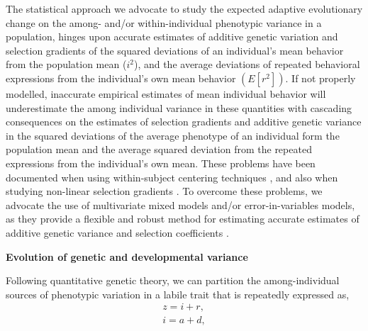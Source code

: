 \documentclass{article}
\begin{document}
The statistical approach we advocate to study the expected adaptive evolutionary change on the among- and/or within-individual phenotypic variance in a population, hinges upon accurate estimates of additive genetic variation and selection gradients of the squared deviations of an individual’s mean behavior from the population mean ($i^2$), and the average deviations of repeated behavioral expressions from the individual’s own mean behavior $(E[r^2 ])$. If not properly modelled, inaccurate empirical estimates of mean individual behavior will underestimate the among individual variance in these quantities with cascading consequences on the estimates of selection gradients and additive genetic variance in the squared deviations of the average phenotype of an individual form the population mean and the average squared deviation from the repeated expressions from the individual’s own mean. These problems have been documented when using within-subject centering techniques \citep{Westneat2020}, and also when studying non-linear selection gradients \citep{Dingemanse2021}. To overcome these problems, we advocate the use of multivariate mixed models and/or error-in-variables models, as they provide a flexible and robust method for estimating accurate estimates of additive genetic variance and selection coefficients \citep{Dingemanse2021}.

\noindent\textbf{Evolution of genetic and developmental variance}

\noindent Following quantitative genetic theory, we can partition the among-individual sources of phenotypic variation in a labile trait that is repeatedly expressed as, 
\begin{subequations} 
	\begin{gather}
	z= i + r, \label{eq:decomp1a} \\
	i = a + d, \label{eq:decomp1b}
	\end{gather}
\end{subequations}
\end{document}
